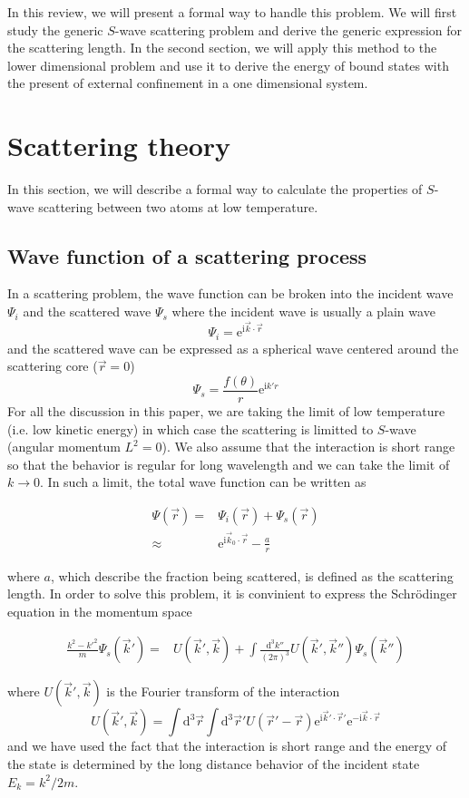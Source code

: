 \documentclass[aps,twocolumn,secnumarabic,balancelastpage,amsmath,amssymb,nofootinbib]{revtex4}
\newcommand{\ud}{\mathrm{d}}
\newcommand{\ue}{\mathrm{e}}
\newcommand{\ui}{\mathrm{i}}
\newcommand{\eqar}[1]
{
  \begin{align*}
    #1
  \end{align*}
}
\newcommand{\paren}[1]{{\left({#1}\right)}}
\begin{document}
In this review, we will present a formal way to handle this problem. We will first study the generic $S$-wave scattering problem and derive the generic expression for the scattering length. In the second section, we will apply this method to the lower dimensional problem and use it to derive the energy of bound states with the present of external confinement in a one dimensional system.

\section{Scattering theory}
In this section, we will describe a formal way to calculate the properties of $S$-wave scattering between two atoms at low temperature.

\subsection{Wave function of a scattering process}
In a scattering problem, the wave function can be broken into the incident wave $\Psi_i$ and the scattered wave $\Psi_s$ where the incident wave is usually a plain wave
\[\Psi_i=\ue^{\ui\vec k\cdot\vec r}\]
and the scattered wave can be expressed as a spherical wave centered around the scattering core ($\vec r=0$)
\[\Psi_s=\frac{f\paren{\theta}}{r}\ue^{\ui k'r}\]
For all the discussion in this paper, we are taking the limit of low temperature (i.e. low kinetic energy) in which case the scattering is limitted to $S$-wave (angular momentum $L^2=0$). We also assume that the interaction is short range so that the behavior is regular for long wavelength and we can take the limit of $k\rightarrow0$. In such a limit, the total wave function can be written as
\eqar{
  \Psi\paren{\vec r}=&\Psi_i\paren{\vec r}+\Psi_s\paren{\vec r}\\
  \approx&\ue^{\ui \vec k_0\cdot \vec r}-\frac{a}{r}
}
where $a$, which describe the fraction being scattered, is defined as the scattering length. In order to solve this problem, it is convinient to express the Schr\"odinger equation in the momentum space
\eqar{
  \frac{k^2-k'^2}{m}\Psi_{s}\paren{\vec k'}=&U\paren{\vec k', \vec k}+\int\frac{\ud^3 k''}{\paren{2\pi}^3}U\paren{\vec k', \vec k''}\Psi_s\paren{\vec k''}
}
where $U\paren{\vec k', \vec k}$ is the Fourier transform of the interaction
\[ U(\vec k', \vec k)=\int\ud^3\vec r\int\ud^3\vec r'U\paren{\vec r'-\vec r}\ue^{\ui\vec k'\cdot\vec r'}\ue^{-\ui\vec k\cdot\vec r}\]
and we have used the fact that the interaction is short range and the energy of the state is determined by the long distance behavior of the incident state $E_k=k^2/2m$.
\end{document}
